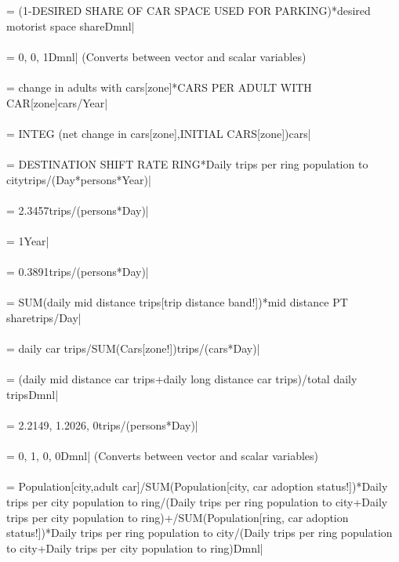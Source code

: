  = (1-DESIRED SHARE OF CAR SPACE USED FOR PARKING)*desired motorist space shareDmnl| \\ \\ 
 = 0, 0, 1Dmnl| (Converts between vector and scalar variables) \\ \\ 
 = change in adults with cars[zone]*CARS PER ADULT WITH CAR[zone]cars/Year| \\ \\ 
 =  INTEG (net change in cars[zone],INITIAL CARS[zone])cars| \\ \\ 
 = DESTINATION SHIFT RATE RING*Daily trips per ring population to citytrips/(Day*persons*Year)| \\ \\ 
 = 2.3457trips/(persons*Day)| \\ \\ 
 = 1Year| \\ \\ 
 = 0.3891trips/(persons*Day)| \\ \\ 
 = SUM(daily mid distance trips[trip distance band!])*mid distance PT sharetrips/Day| \\ \\ 
 = daily car trips/SUM(Cars[zone!])trips/(cars*Day)| \\ \\ 
 = (daily mid distance car trips+daily long distance car trips)/total daily tripsDmnl| \\ \\ 
 = 2.2149, 1.2026, 0trips/(persons*Day)| \\ \\ 
 = 0, 1, 0, 0Dmnl| (Converts between vector and scalar variables) \\ \\ 
 = Population[city,adult car]/SUM(Population[city, car adoption status!])*Daily trips per city population to ring/(Daily trips per ring population to city+Daily trips per city population to ring)+/SUM(Population[ring, car adoption status!])*Daily trips per ring population to city/(Daily trips per ring population to city+Daily trips per city population to ring)Dmnl| \\ \\ 
